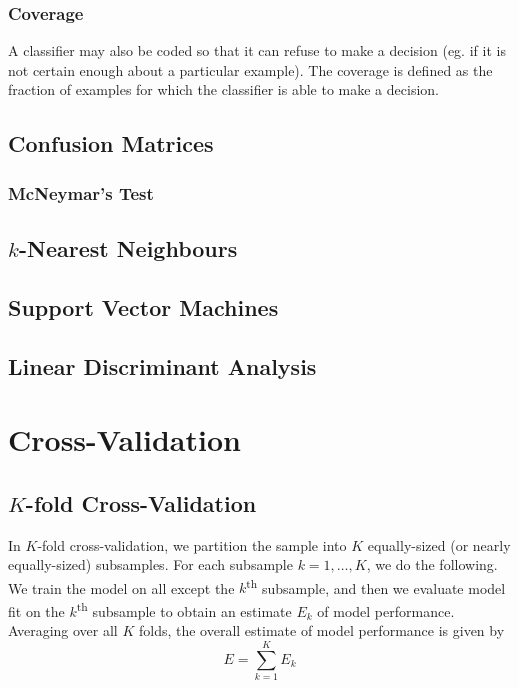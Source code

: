 \documentclass[11pt]{report} %
\begin{document}
\subsubsection{Coverage}

A classifier may also be coded so that it can refuse to make a decision (eg. if it is not certain enough about a particular example). The coverage is defined as the fraction of examples for which the classifier is able to make a decision.

\subsection{Confusion Matrices}

\subsubsection{McNeymar's Test}

\subsection{$k$-Nearest Neighbours}

\subsection{Support Vector Machines}

\subsection{Linear Discriminant Analysis}

\section{Cross-Validation}

\subsection{$K$-fold Cross-Validation}

In $K$-fold cross-validation, we partition the sample into $K$ equally-sized (or nearly equally-sized) subsamples. For each subsample $k = 1, \dots, K$, we do the following. We train the model on all except the $k$\textsuperscript{th} subsample, and then we evaluate model fit on the $k$\textsuperscript{th} subsample to obtain an estimate $E_{k}$ of model performance. Averaging over all $K$ folds, the overall estimate of model performance is given by
\begin{equation}
E = \sum_{k = 1}^{K}E_{k}
\end{equation}
\end{document}
